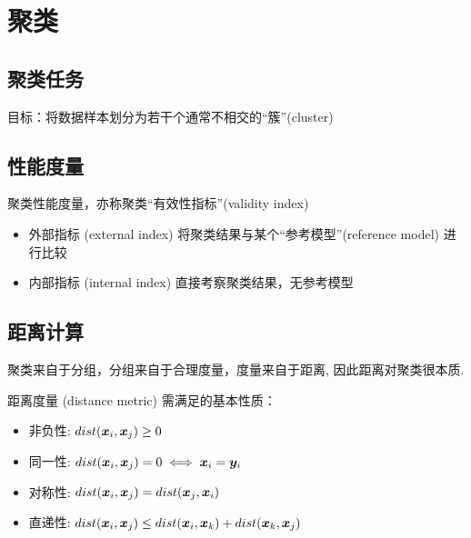 \newpage
\section{聚类}
\subsection{聚类任务}
目标：将数据样本划分为若干个通常不相交的“簇”(cluster)

\subsection{性能度量}
聚类性能度量，亦称聚类“有效性指标”(validity index)
\begin{itemize}
    \item 外部指标 (external index)
    \subitem 将聚类结果与某个“参考模型”(reference model) 进行比较
    \item 内部指标 (internal index)
    \subitem 直接考察聚类结果，无参考模型
\end{itemize}



\subsection{距离计算}
聚类来自于分组，分组来自于合理度量，度量来自于距离, 因此距离对聚类很本质. 

距离度量 (distance metric) 需满足的基本性质：
\begin{itemize}
    \item 非负性: $dist(\bm{x}_i,\bm{x}_j)\ge0$
    \item 同一性: $dist(\bm{x}_i,\bm{x}_j)=0 \iff \bm{x}_i=\bm{y}_i$
    \item 对称性: $dist(\bm{x}_i,\bm{x}_j)=dist(\bm{x}_j,\bm{x}_i)$
    \item 直递性: $dist(\bm{x}_i,\bm{x}_j)\le dist(\bm{x}_i,\bm{x}_k)+dist(\bm{x}_k,\bm{x}_j)$
\end{itemize}

